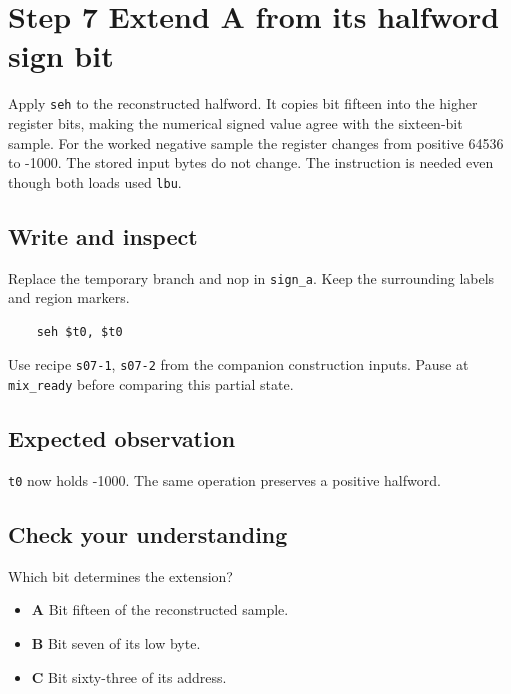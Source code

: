 \section{Step 7 Extend A from its halfword sign bit}\label{pcm-s07}

Apply \texttt{seh} to the reconstructed halfword. It copies bit fifteen into the higher register bits, making the numerical signed value agree with the sixteen-bit sample. For the worked negative sample the register changes from positive 64536 to -1000. The stored input bytes do not change. The instruction is needed even though both loads used \texttt{lbu}.

\subsection{Write and inspect}
Replace the temporary branch and nop in \texttt{sign\_a}. Keep the surrounding labels and region markers.

\begin{verbatim}
    seh $t0, $t0
\end{verbatim}
Use recipe \texttt{s07-1}, \texttt{s07-2} from the companion construction inputs. Pause at \texttt{mix\_ready} before comparing this partial state.

\subsection{Expected observation}
\texttt{t0} now holds -1000. The same operation preserves a positive halfword.

\subsection{Check your understanding}
Which bit determines the extension?

\begin{itemize}
  \item \textbf{A} Bit fifteen of the reconstructed sample.
  \item \textbf{B} Bit seven of its low byte.
  \item \textbf{C} Bit sixty-three of its address.
\end{itemize}
